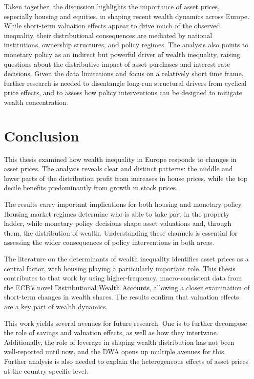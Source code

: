 \documentclass[
  a4paper,
  DIV=11,
  numbers=noendperiod]{scrartcl}
\begin{document}
Taken together, the discussion highlights the importance of asset
prices, especially housing and equities, in shaping recent wealth
dynamics across Europe. While short-term valuation effects appear to
drive much of the observed inequality, their distributional consequences
are mediated by national institutions, ownership structures, and policy
regimes. The analysis also points to monetary policy as an indirect but
powerful driver of wealth inequality, raising questions about the
distributive impact of asset purchases and interest rate decisions.
Given the data limitations and focus on a relatively short time frame,
further research is needed to disentangle long-run structural drivers
from cyclical price effects, and to assess how policy interventions can
be designed to mitigate wealth concentration.

\section{Conclusion}\label{sec-conclusion}

This thesis examined how wealth inequality in Europe responds to changes
in asset prices. The analysis reveals clear and distinct patterns: the
middle and lower parts of the distribution profit from increases in
house prices, while the top decile benefits predominantly from growth in
stock prices.

The results carry important implications for both housing and monetary
policy. Housing market regimes determine who is able to take part in the
property ladder, while monetary policy decisions shape asset valuations
and, through them, the distribution of wealth. Understanding these
channels is essential for assessing the wider consequences of policy
interventions in both areas.

The literature on the determinants of wealth inequality identifies asset
prices as a central factor, with housing playing a particularly
important role. This thesis contributes to that work by using
higher-frequency, macro-consistent data from the ECB's novel
Distributional Wealth Accounts, allowing a closer examination of
short-term changes in wealth shares. The results confirm that valuation
effects are a key part of wealth dynamics.

This work yields several avenues for future research. One is to further
decompose the role of savings and valuation effects, as well as how they
intertwine. Additionally, the role of leverage in shaping wealth
distribution has not been well-reported until now, and the DWA opens up
multiple avenues for this. Further analysis is also needed to explain
the heterogeneous effects of asset prices at the country-specific level.
\end{document}
